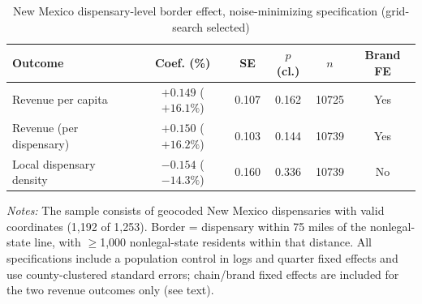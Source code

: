 \documentclass[english,12pt]{article}
\begin{document}
\begin{table}[htbp]
\centering
\caption{New Mexico dispensary-level border effect, noise-minimizing specification (grid-search selected)}
\label{tab:nm_dispensary_border_best}
\footnotesize
\begin{tabular}{lccccc}
\toprule
Outcome & Coef. (\%) & SE & $p$ (cl.) & $n$ & Brand FE \\
\midrule
Revenue per capita & $+0.149$ ($+16.1\%$) & 0.107 & 0.162 & 10725 & Yes \\
Revenue (per dispensary) & $+0.150$ ($+16.2\%$) & 0.103 & 0.144 & 10739 & Yes \\
Local dispensary density & $-0.154$ ($-14.3\%$) & 0.160 & 0.336 & 10739 & No \\
\bottomrule
\end{tabular}
\begin{minipage}{0.98\textwidth}
\vspace{0.3em}
\footnotesize
\textit{Notes:} The sample consists of geocoded New Mexico dispensaries with valid coordinates (1,192 of 1,253). Border =
dispensary within 75 miles of the nonlegal-state line, with $\geq$1,000 nonlegal-state residents within that
distance. All specifications include a population control in logs and quarter fixed effects and use county-clustered standard errors;
chain/brand fixed effects are included for the two revenue outcomes only (see text).
\end{minipage}
\end{table}
\end{document}

